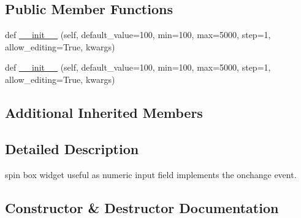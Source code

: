 \subsection*{Public Member Functions}
\begin{DoxyCompactItemize}
\item 
def \hyperlink{classremi_1_1gui_1_1SpinBox_a53a8fdc4ee14fdbcd78343c5d27139fc}{\+\_\+\+\_\+init\+\_\+\+\_\+} (self, default\+\_\+value=\textquotesingle{}100\textquotesingle{}, min=100, max=5000, step=1, allow\+\_\+editing=True, kwargs)
\item 
def \hyperlink{classremi_1_1gui_1_1SpinBox_a53a8fdc4ee14fdbcd78343c5d27139fc}{\+\_\+\+\_\+init\+\_\+\+\_\+} (self, default\+\_\+value=\textquotesingle{}100\textquotesingle{}, min=100, max=5000, step=1, allow\+\_\+editing=True, kwargs)
\end{DoxyCompactItemize}
\subsection*{Additional Inherited Members}


\subsection{Detailed Description}
\begin{DoxyVerb}spin box widget useful as numeric input field implements the onchange event.
\end{DoxyVerb}
 

\subsection{Constructor \& Destructor Documentation}
